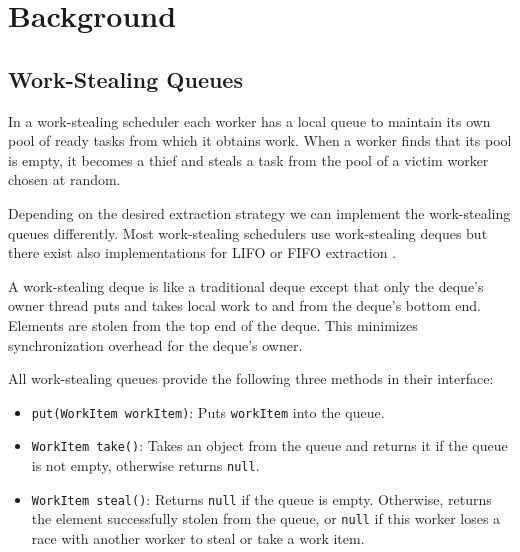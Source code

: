 
\chapter{Background}
\label{chap:queues-background}

\section{Work-Stealing Queues}
\label{sec:queues-background-work-stealing-queues}

In a work-stealing scheduler each worker has a local queue to maintain
its own pool of ready tasks from which it obtains work. When a worker
finds that its pool is empty, it becomes a thief and steals a task
from the pool of a victim worker chosen at random.

Depending on the desired extraction strategy we can implement the
work-stealing queues differently. Most work-stealing schedulers use
work-stealing deques \cite{Arora2001, Acar2002, Blumofe1995,
  Frigo1998, Danaher2005} but there exist also implementations for
LIFO or FIFO extraction \cite{Michael2009}.

A work-stealing deque is like a traditional deque \cite{Knuth1997}
except that only the deque's owner thread puts and takes local work to
and from the deque's bottom end. Elements are stolen from the top end
of the deque. This minimizes synchronization overhead for the deque's
owner.

All work-stealing queues provide the following three methods in their
interface:

\begin{itemize}
\item \lstinline!put(WorkItem workItem)!: Puts \lstinline!workItem!
  into the queue.
\item \lstinline!WorkItem take()!: Takes an object from the queue and
  returns it if the queue is not empty, otherwise returns
  \lstinline!null!.
\item \lstinline!WorkItem steal()!: Returns \lstinline!null! if the
  queue is empty. Otherwise, returns the element successfully stolen
  from the queue, or \lstinline!null! if this worker loses a race with
  another worker to steal or take a work item.
\end{itemize}

